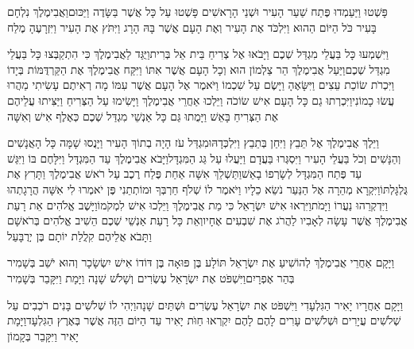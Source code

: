 \documentclass[../main/main.tex]{subfiles}
\begin{document}
\begin{multicols*}{\ncols}
פָּשְׁטוּ וַיַּעַמְדוּ פֶּתַח שַׁעַר הָעִיר וּשְׁנֵי הָרָאשִׁים פָּשְׁטוּ עַל כָּל אֲשֶׁר בַּשָּׂדֶה וַיַּכּוּם\PreVerseSpace{}וַאֲבִימֶלֶךְ נִלְחָם בָּעִיר כֹּל הַיּוֹם הַהוּא וַיִּלְכֹּד אֶת הָעִיר וְאֶת הָעָם אֲשֶׁר בָּהּ הָרָג וַיִּתֹּץ אֶת הָעִיר וַיִּזְרָעֶהָ מֶלַח\OpenSection{}\par
{}וַיִּשְׁמְעוּ כָּל בַּעֲלֵי מִגְדַּל שְׁכֶם וַיָּבֹאוּ אֶל צְרִיחַ בֵּית אֵל בְּרִית\PreVerseSpace{}וַיֻּגַּד לַאֲבִימֶלֶךְ כִּי הִתְקַבְּצוּ כָּל בַּעֲלֵי מִגְדַּל שְׁכֶם\PreVerseSpace{}וַיַּעַל אֲבִימֶלֶךְ הַר צַלְמוֹן הוּא וְכָל הָעָם אֲשֶׁר אִתּוֹ וַיִּקַּח אֲבִימֶלֶךְ אֶת הַקַּרְדֻּמּוֹת בְּיָדוֹ וַיִּכְרֹת שׂוֹכַת עֵצִים וַיִּשָּׂאֶהָ וַיָּשֶׂם עַל שִׁכְמוֹ וַיֹּאמֶר אֶל הָעָם אֲשֶׁר עִמּוֹ מָה רְאִיתֶם עָשִׂיתִי מַהֲרוּ עֲשׂוּ כָמוֹנִי\PreVerseSpace{}וַיִּכְרְתוּ גַם כָּל הָעָם אִישׁ שׂוֹכֹה וַיֵּלְכוּ אַחֲרֵי אֲבִימֶלֶךְ וַיָּשִׂימוּ עַל הַצְּרִיחַ וַיַּצִּיתוּ עֲלֵיהֶם אֶת הַצְּרִיחַ בָּאֵשׁ וַיָּמֻתוּ גַּם כָּל אַנְשֵׁי מִגְדַּל שְׁכֶם כְּאֶלֶף אִישׁ וְאִשָּׁה\OpenSection{}\par
{}וַיֵּלֶךְ אֲבִימֶלֶךְ אֶל תֵּבֵץ וַיִּחַן בְּתֵבֵץ וַיִּלְכְּדָהּ\PreVerseSpace{}וּמִגְדַּל עֹז הָיָה בְתוֹךְ הָעִיר וַיָּנֻסוּ שָׁמָּה כָּל הָאֲנָשִׁים וְהַנָּשִׁים וְכֹל בַּעֲלֵי הָעִיר וַיִּסְגְּרוּ בַּעֲדָם וַיַּעֲלוּ עַל גַּג הַמִּגְדָּל\PreVerseSpace{}וַיָּבֹא אֲבִימֶלֶךְ עַד הַמִּגְדָּל וַיִּלָּחֶם בּוֹ וַיִּגַּשׁ עַד פֶּתַח הַמִּגְדָּל לְשָׂרְפוֹ בָאֵשׁ\PreVerseSpace{}וַתַּשְׁלֵךְ אִשָּׁה אַחַת פֶּלַח רֶכֶב עַל רֹאשׁ אֲבִימֶלֶךְ וַתָּרִץ אֶת גֻּלְגָּלְתּוֹ\PreVerseSpace{}וַיִּקְרָא מְהֵרָה אֶל הַנַּעַר נֹשֵׂא כֵלָיו וַיֹּאמֶר לוֹ שְׁלֹף חַרְבְּךָ וּמוֹתְתֵנִי פֶּן יֹאמְרוּ לִי אִשָּׁה הֲרָגָתְהוּ וַיִּדְקְרֵהוּ נַעֲרוֹ וַיָּמֹת\PreVerseSpace{}וַיִּרְאוּ אִישׁ יִשְׂרָאֵל כִּי מֵת אֲבִימֶלֶךְ וַיֵּלְכוּ אִישׁ לִמְקֹמוֹ\PreVerseSpace{}וַיָּשֶׁב אֱלֹהִים אֵת רָעַת אֲבִימֶלֶךְ אֲשֶׁר עָשָׂה לְאָבִיו לַהֲרֹג אֶת שִׁבְעִים אֶחָיו\PreVerseSpace{}וְאֵת כָּל רָעַת אַנְשֵׁי שְׁכֶם הֵשִׁיב אֱלֹהִים בְּרֹאשָׁם וַתָּבֹא אֲלֵיהֶם קִלֲלַת יוֹתָם בֶּן יְרֻבָּעַל\OpenSection{}\par
{}וַיָּקָם אַחֲרֵי אֲבִימֶלֶךְ לְהוֹשִׁיעַ אֶת יִשְׂרָאֵל תּוֹלָע בֶּן פּוּאָה בֶּן דּוֹדוֹ אִישׁ יִשְׂשָׂכָר וְהוּא יֹשֵׁב בְּשָׁמִיר בְּהַר אֶפְרָיִם\PreVerseSpace{}וַיִּשְׁפֹּט אֶת יִשְׂרָאֵל עֶשְׂרִים וְשָׁלֹשׁ שָׁנָה וַיָּמָת וַיִּקָּבֵר בְּשָׁמִיר\OpenSection{}\par
{}וַיָּקָם אַחֲרָיו יָאִיר הַגִּלְעָדִי וַיִּשְׁפֹּט אֶת יִשְׂרָאֵל עֶשְׂרִים וּשְׁתַּיִם שָׁנָה\PreVerseSpace{}וַיְהִי לוֹ שְׁלֹשִׁים בָּנִים רֹכְבִים עַל שְׁלֹשִׁים עֲיָרִים וּשְׁלֹשִׁים עָרִים\SubEnd{} לָהֶם לָהֶם יִקְרְאוּ חַוֺּת יָאִיר עַד הַיּוֹם הַזֶּה אֲשֶׁר בְּאֶרֶץ הַגִּלְעָד\PreVerseSpace{}וַיָּמָת יָאִיר וַיִּקָּבֵר בְּקָמוֹן\OpenSection{}\par

\end{multicols*}
\end{document}
